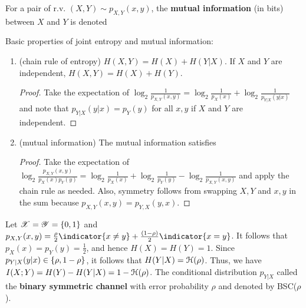 \documentclass[letterpaper,10pt,english]{article}
\begin{document}
\begin{defn}
For a pair of r.v. $(X, Y ) \sim p_{X,Y}(x, y)$, the \textbf{mutual information} (in bits)
between $X$ and $Y$ is denoted
\end{defn}
\begin{lem}
Basic properties of joint entropy and mutual information:
\begin{enumerate}
\item (chain rule of entropy) $H(X,Y) = H(X)+H(Y|X)$. If $X$ and $Y$ are independent,
$H(X, Y ) = H(X) + H(Y )$.
\begin{proof}
Take the expectation of $\log_2\frac{1}{p_{X,Y}(x,y)} =\log_2\frac{1}{p_X(x)} + \log_2\frac{1}{p_{Y|X}(y|x)}$ and note that $p_{Y |X}(y|x) = p_Y (y)$ for all $x, y$ if $X$ and $Y$ are independent.
\end{proof}
\item (mutual information) The mutual information satisfies 
\begin{proof}
Take the expectation of $\log_2\frac{p_{X,Y}(x,y)}{p_X(x)p_Y(y)} =\log_2\frac{1}{p_X(x)} + \log_2\frac{1}{p_Y(y)}  - \log_2\frac{1}{p_{X,Y}(x,y)}$ and apply the chain rule as needed. 
Also, symmetry follows from swapping $X,Y$ and $x, y$ in the sum because $p_{X,Y} (x, y) = p_{Y,X} (y, x)$. 
\end{proof}
\end{enumerate}
\end{lem} 
\begin{shaded*}\begin{exmp}
Let $\mathscr{X} = \mathscr{Y} = \left\{0, 1\right\}$ and $p_{X,Y}(x, y) = \frac{\rho}{2} \indicator{x \neq y} + \frac{(1 - \rho)}{2}\indicator{x=y}$. 
It follows that $p_X(x)=p_Y(y)= \frac{1}{2}$, and hence $H(X)= H(Y) = 1$. 
Since $p_{Y|X}(y|x) \in \left\{\rho,1-\rho\right\}$, it follows that $H(Y|X)= \mathcal{H}(\rho)$. 
Thus, we have $I(X;Y)=H(Y) - H (Y |X) = 1 - \mathcal{H}(\rho)$. 
The conditional distribution $p_{Y |X}$ called the \textbf{binary symmetric channel} with error probability $\rho$ and denoted by BSC($\rho$).
\end{exmp}\end{shaded*} 
 
\end{document}

